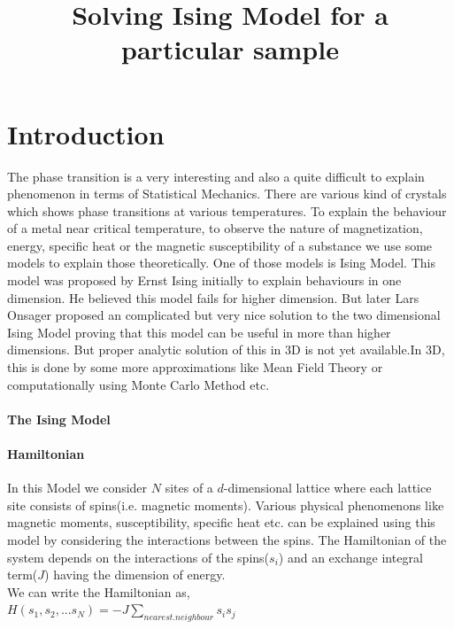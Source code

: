 \documentclass[20pt]{article}
\begin{document}
\title{{\LARGE \textbf{Solving Ising Model for a particular sample}}}
\author{}
\date{}
\maketitle
\section{{\Large Introduction\\}}
The phase transition is a very interesting and also a quite difficult to explain phenomenon in terms of Statistical Mechanics. There are various kind of crystals which shows phase transitions at various temperatures. To explain the behaviour of a metal near critical temperature, to observe the nature of magnetization, energy, specific heat or the magnetic susceptibility of a substance we use some models to explain those theoretically. One of those models is Ising Model. This model was proposed by Ernst Ising initially to explain behaviours in one dimension. He believed this model fails for higher dimension. But later Lars Onsager proposed an complicated but very nice solution to the two dimensional Ising Model proving that this model can be useful in more than higher dimensions. But proper analytic solution of this in 3D is not yet available.In 3D, this is done by some more approximations like Mean Field Theory or computationally using Monte Carlo Method etc.   \\
\paragraph*{{\large The Ising Model}}
\paragraph*{Hamiltonian\\}

In this Model we consider $N$ sites of a $d$-dimensional lattice where each lattice site consists of spins(i.e. magnetic moments). Various physical phenomenons like magnetic moments, susceptibility, specific heat etc. can be explained using this model by considering the interactions between the spins. The Hamiltonian of the system depends on the interactions of the spins($s_i$) and an exchange integral term($J$) having the dimension of energy.\\
We can write the Hamiltonian as,\\


$H(s_1,s_2,...s_N)=-J \sum_{nearest.neighbour} s_i s_j$ \\
\end{document}
